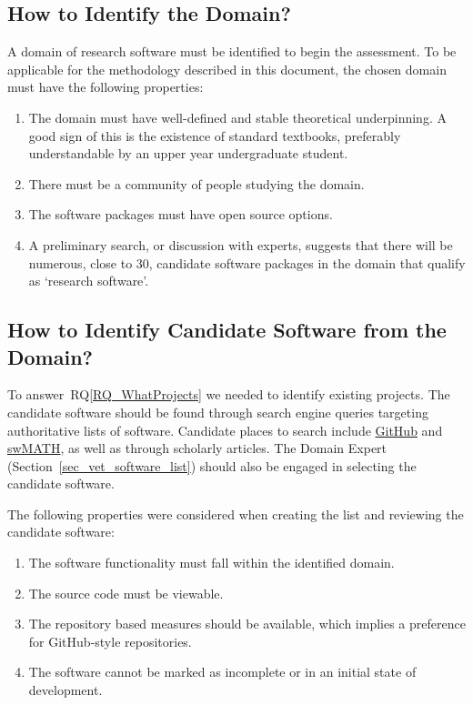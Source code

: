 \documentclass[runningheads]{llncs}
\newcommand{\rqref}[1]{RQ\ref{#1}}
\begin{document}
\subsection{How to Identify the Domain?} \label{SecIdentifyDomain} 

A domain of research software must be identified to begin the assessment. To be
applicable for the methodology described in this document, the chosen domain
must have the following properties:

\begin{enumerate}
\item The domain must have well-defined and stable theoretical underpinning.  A
  good sign of this is the existence of standard textbooks, preferably
  understandable by an upper year undergraduate student.
\item There must be a community of people studying the domain.
\item The software packages must have open source options.
\item A preliminary search, or discussion with experts, suggests that there will
  be numerous, close to 30, candidate software packages in the domain that
  qualify as `research software'.
\end{enumerate}	

\subsection{How to Identify Candidate Software from the Domain?}
\label{identifysoftware}

To answer~\rqref{RQ_WhatProjects} we needed to identify existing projects. The
candidate software should be found through search engine queries targeting
authoritative lists of software.  Candidate places to search include
\href{https://github.com/} {GitHub} and \href{https://swmath.org/} {swMATH}, as
well as through scholarly articles. The Domain Expert
(Section~\ref{sec_vet_software_list}) should also be engaged in selecting the
candidate software.

The following properties were considered when creating the list and reviewing
the candidate software:

\begin{enumerate}
	\item The software functionality must fall within the identified domain.
	\item The source code must be viewable.
	\item The repository based measures should be available, which implies a
	preference for GitHub-style repositories.
	\item The software cannot be marked as incomplete or in an initial state of
	development.
\end{enumerate}
\end{document}
